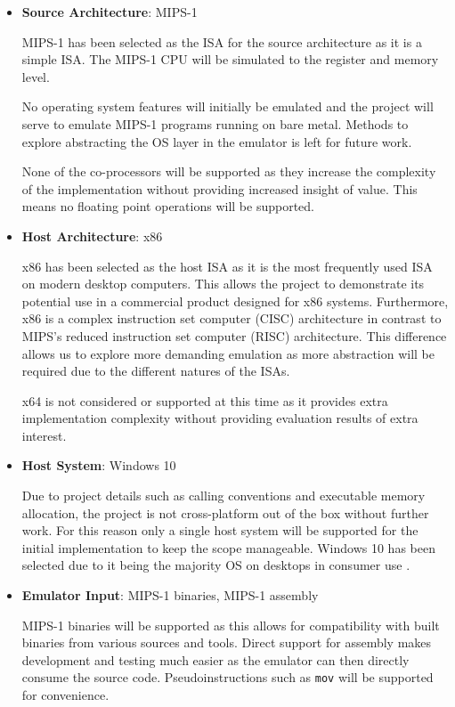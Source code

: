 \begin{itemize}
    \item \textbf{Source Architecture}: MIPS-1
    
    MIPS-1 has been selected as the ISA for the source architecture as it is a simple ISA. The MIPS-1 CPU will be simulated to the register and memory level.

    No operating system features will initially be emulated and the project will serve to emulate MIPS-1 programs running on bare metal. Methods to explore abstracting the OS layer in the emulator is left for future work.

    None of the co-processors will be supported as they increase the complexity of the implementation without providing increased insight of value. This means no floating point operations will be supported.
    
    \item \textbf{Host Architecture}: x86
    
    x86 has been selected as the host ISA as it is the most frequently used ISA on modern desktop computers. This allows the project to demonstrate its potential use in a commercial product designed for x86 systems. Furthermore, x86 is a complex instruction set computer (CISC) architecture in contrast to MIPS's reduced instruction set computer (RISC) architecture. This difference allows us to explore more demanding emulation as more abstraction will be required due to the different natures of the ISAs.
    
    x64 is not considered or supported at this time as it provides extra implementation complexity without providing evaluation results of extra interest.
    
    \item \textbf{Host System}: Windows 10
    
    Due to project details such as calling conventions and executable memory allocation, the project is not cross-platform out of the box without further work. For this reason only a single host system will be supported for the initial implementation to keep the scope manageable. Windows 10 has been selected due to it being the majority OS on desktops in consumer use \cite{desktop-os-share, win-os-share}.
    
    \item \textbf{Emulator Input}: MIPS-1 binaries, MIPS-1 assembly
    
    MIPS-1 binaries will be supported as this allows for compatibility with built binaries from various sources and tools. Direct support for assembly makes development and testing much easier as the emulator can then directly consume the source code. Pseudoinstructions such as \texttt{mov} will be supported for convenience.


\end{itemize}
